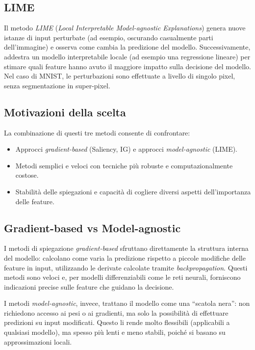 \documentclass{article}
\begin{document}
\subsection{LIME}
Il metodo \emph{LIME} (\emph{Local Interpretable Model-agnostic Explanations})
genera nuove istanze di input perturbate (ad esempio, oscurando casualmente
parti dell’immagine) e osserva come cambia la predizione del modello.
Successivamente, addestra un modello interpretabile locale (ad esempio una
regressione lineare) per stimare quali feature hanno avuto il maggiore impatto
sulla decisione del modello. Nel caso di MNIST, le perturbazioni sono
effettuate a livello di singolo pixel, senza segmentazione in super-pixel.

\subsection{Motivazioni della scelta}
La combinazione di questi tre metodi consente di confrontare:
\begin{itemize}
      \item Approcci \emph{gradient-based} (Saliency, IG) e approcci \emph{model-agnostic}
            (LIME).
      \item Metodi semplici e veloci con tecniche più robuste e computazionalmente costose.
      \item Stabilità delle spiegazioni e capacità di cogliere diversi aspetti
            dell’importanza delle feature.
\end{itemize}

\subsection{Gradient-based vs Model-agnostic}
I metodi di spiegazione \emph{gradient-based} sfruttano direttamente la
struttura interna del modello: calcolano come varia la predizione rispetto a
piccole modifiche delle feature in input, utilizzando le derivate calcolate
tramite \emph{backpropagation}. Questi metodi sono veloci e, per modelli
differenziabili come le reti neurali, forniscono indicazioni precise sulle
feature che guidano la decisione.

I metodi \emph{model-agnostic}, invece, trattano il modello come una “scatola
nera”: non richiedono accesso ai pesi o ai gradienti, ma solo la possibilità di
effettuare predizioni su input modificati. Questo li rende molto flessibili
(applicabili a qualsiasi modello), ma spesso più lenti e meno stabili, poiché
si basano su approssimazioni locali.
\end{document}
